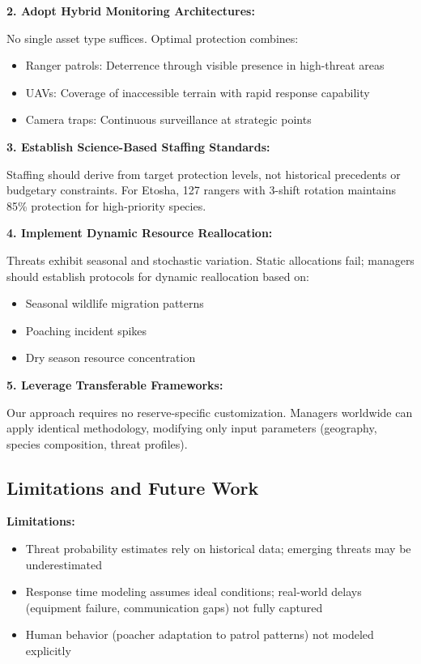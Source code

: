 \noindent \textbf{2. Adopt Hybrid Monitoring Architectures:}

No single asset type suffices. Optimal protection combines:
\begin{itemize}
\item Ranger patrols: Deterrence through visible presence in high-threat areas
\item UAVs: Coverage of inaccessible terrain with rapid response capability
\item Camera traps: Continuous surveillance at strategic points
\end{itemize}

\noindent \textbf{3. Establish Science-Based Staffing Standards:}

Staffing should derive from target protection levels, not historical precedents or budgetary constraints. For Etosha, 127 rangers with 3-shift rotation maintains 85\% protection for high-priority species.

\noindent \textbf{4. Implement Dynamic Resource Reallocation:}

Threats exhibit seasonal and stochastic variation. Static allocations fail; managers should establish protocols for dynamic reallocation based on:
\begin{itemize}
\item Seasonal wildlife migration patterns
\item Poaching incident spikes
\item Dry season resource concentration
\end{itemize}

\noindent \textbf{5. Leverage Transferable Frameworks:}

Our approach requires no reserve-specific customization. Managers worldwide can apply identical methodology, modifying only input parameters (geography, species composition, threat profiles).

\subsection{Limitations and Future Work}

\textbf{Limitations:}
\begin{itemize}
\item Threat probability estimates rely on historical data; emerging threats may be underestimated
\item Response time modeling assumes ideal conditions; real-world delays (equipment failure, communication gaps) not fully captured
\item Human behavior (poacher adaptation to patrol patterns) not modeled explicitly
\end{itemize}


